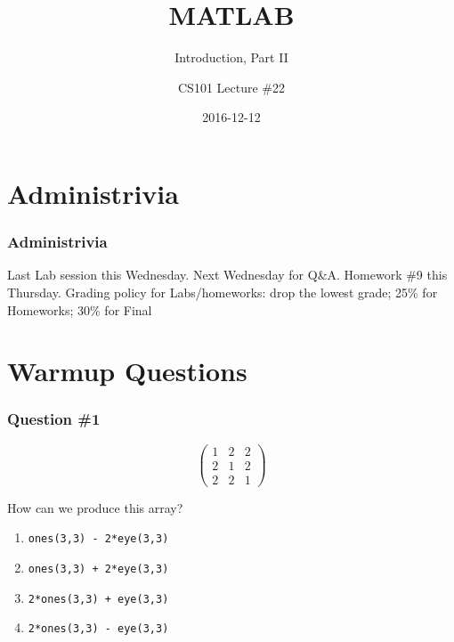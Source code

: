 \documentclass[11pt]{beamer}
\title{MATLAB}
\subtitle{Introduction, Part II}
\author{CS101 Lecture \#22}
\date{2016-12-12}
\begin{document}
  \setcounter{showProgressBar}{0}
  \setcounter{showSlideNumbers}{0}

\frame{\titlepage}

\setcounter{framenumber}{0}
\setcounter{showProgressBar}{1}
\setcounter{showSlideNumbers}{1}

\section{Administrivia}

\begin{frame}
  \frametitle{Administrivia}
  \Enlarge

  \begin{itemize}
  \myitem  Last Lab session this Wednesday.
  \myitem  Next Wednesday for Q\&A.
  \myitem  Homework \#9 this Thursday.
  \myitem  Grading policy for Labs/homeworks: drop the lowest grade; 25\% for Homeworks; 30\% for Final
  \end{itemize}
\end{frame}

\section{Warmup Questions}

\begin{frame}[fragile]
  \frametitle{Question \#1}
  \Enlarge
$$
\left(
\begin{array}{ccc}
1 & 2 & 2 \\
2 & 1 & 2 \\
2 & 2 & 1
\end{array}
\right)
$$

How can we produce this array?

  \begin{enumerate}[label=\Alph*]
    \item  \texttt{ones(3,3) - 2*eye(3,3)}
    \item  \texttt{ones(3,3) + 2*eye(3,3)}
    \item  \texttt{2*ones(3,3) + eye(3,3)}
    \item  \texttt{2*ones(3,3) - eye(3,3)}
  \end{enumerate}
\end{frame}
\end{document}
